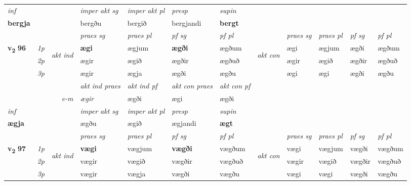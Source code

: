\begin{longtable}[l]{X>{\footnotesize\itshape}llXXXXlXXXX}
   {\textit{inf}} & &  & \textit{imper akt sg} & \textit{imper akt pl}   & \textit{presp} & \textit{supin}   \\*
  {\textbf{bergja}} & && bergðu  & bergið   & bergjandi &  \textbf{bergt}   \\*

\midrule

 \midrule
 & &   & \textit{praes sg}  & \textit{praes pl}    & \textit{ pf sg} & \textit{pf pl} & & \textit{praes sg}  & \textit{praes pl}    & \textit{pf sg} & \textit{pf pl }  \\ \cmidrule{4-7} \cmidrule{9-12}
 \multirow{2}{*}{{{\textbf{v{\textsubscript{2}}} \Large{\textbf{96}}}}}  & 1p & \multirow{3}{*}{\begin{turn}{90}\textit{akt ind}\end{turn}} & \textbf{ægi} & ægjum & \textbf{ægði} & ægðum & \multirow{3}{*}{\begin{turn}{90}\textit{akt con}\end{turn}} &ægi & ægjum & ægði & ægðum\\*
 & 2p &  &  ægir  & ægið & ægðir & ægðuð & & ægir & ægið & ægðir & ægðuð \\*
 & 3p &  & ægir & ægja & ægði & ægðu & & ægi & ægi& ægði & ægðu \\*
\cmidrule{4-7} \cmidrule{9-12}

   && &  \textit{akt ind praes} & \textit{akt ind pf} & \textit{akt con praes} & \textit{akt con pf} \\*
\multicolumn{3}{r}{\textit{e-m}} & ægir & ægði & ægi & ægði \\*

\cmidrule{4-7}
   {\textit{inf}} & &  & \textit{imper akt sg} & \textit{imper akt pl}   & \textit{presp} & \textit{supin}   \\*
  {\textbf{ægja}} & && ægðu  & ægið   & ægjandi &  \textbf{ægt}   \\*

\midrule

 & &   & \textit{praes sg}  & \textit{praes pl}    & \textit{ pf sg} & \textit{pf pl} & & \textit{praes sg}  & \textit{praes pl}    & \textit{pf sg} & \textit{pf pl }  \\ \cmidrule{4-7} \cmidrule{9-12}
 \multirow{2}{*}{{{\textbf{v{\textsubscript{2}}} \Large{\textbf{97}}}}}  & 1p & \multirow{3}{*}{\begin{turn}{90}\textit{akt ind}\end{turn}} & \textbf{vægi} & vægjum & \textbf{vægði} & vægðum & \multirow{3}{*}{\begin{turn}{90}\textit{akt con}\end{turn}} &vægi & vægjum & vægði & vægðum\\*
 & 2p &  &  vægir  & vægið & vægðir & vægðuð & & vægir & vægið & vægðir & vægðuð \\*
 & 3p &  & vægir & vægja & vægði & vægðu & & vægi & vægi& vægði & vægðu \\*
\cmidrule{4-7} \cmidrule{9-12}


\end{longtable}
